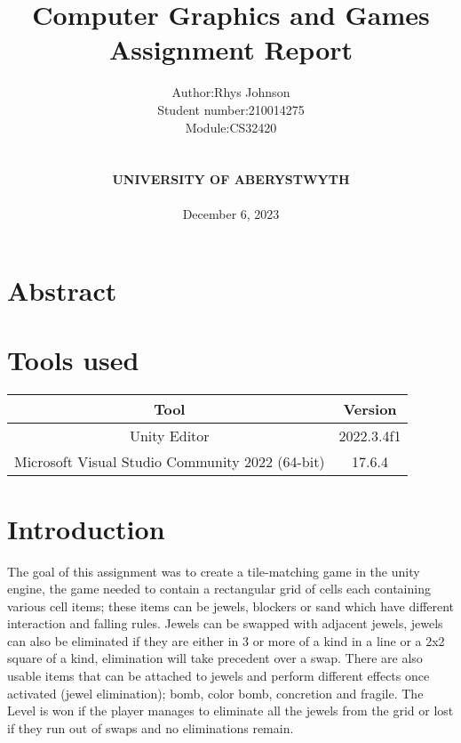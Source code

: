 \documentclass[12pt, a4paper]{article}
\title{%
	\textbf{Computer Graphics and Games Assignment Report} 
}
\author{
	\begin{tabular} {r l}
		Author: & Rhys Johnson \\
		Student number: & 210014275 \\
		Module: & CS32420
	\end{tabular} \\ \\\textbf{UNIVERSITY OF ABERYSTWYTH} 
	\\ \\ December 6, 2023
}
\date{}
\begin{document}
	\maketitle
	\pagebreak
	
	\section{Abstract}
	
	\section{Tools used}
	    \begin{center}
		\begin{tabular} {|| c | c ||}
			\hline
			Tool & Version \\
			\hline
			\hline
			Unity Editor & 2022.3.4f1 \\
			\hline
			Microsoft Visual Studio Community 2022 (64-bit) & 17.6.4 \\
			\hline
	    \end{tabular}
    	\end{center}

	\section{Introduction}
	The goal of this assignment was to create a tile-matching game in the unity engine, the game needed 	to contain a rectangular grid of cells each containing various cell items; these items can be jewels, blockers or sand which have different interaction and falling rules. Jewels can be swapped with adjacent jewels, jewels can also be eliminated if they are either in 3 or more of a kind in a line or a 2x2 square of a kind, elimination will take precedent over a swap. There are also usable items that can be attached to jewels and perform different effects once activated (jewel elimination); bomb, color bomb, concretion and fragile. The Level is won if the player manages to eliminate all the jewels from the grid or lost if they run out of swaps and no eliminations remain.
	
	
\end{document}
